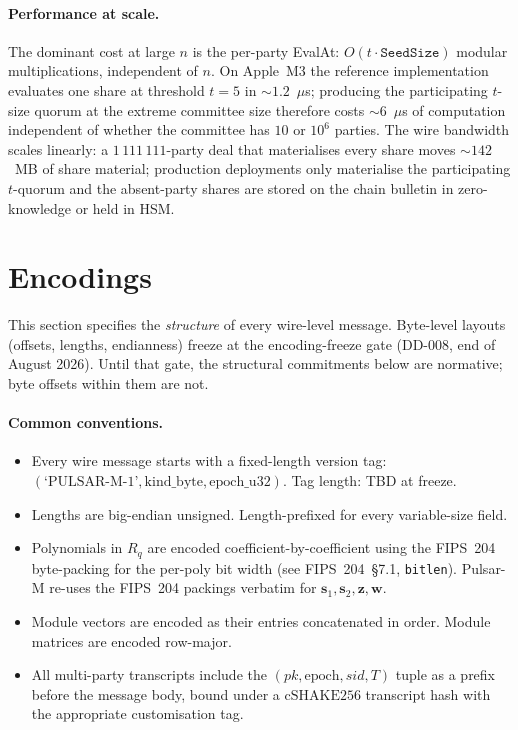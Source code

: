 \documentclass[11pt,a4paper]{article}
\theoremstyle{definition}
\theoremstyle{remark}
\newcommand{\Rq}{R_q}
\newcommand{\cSHAKE}{\mathrm{cSHAKE256}}
\begin{document}
\paragraph{Performance at scale.}
The dominant cost at large $n$ is the per-party EvalAt: $O(t \cdot
\mathtt{SeedSize})$ modular multiplications, independent of $n$. On
Apple~M3 the reference implementation evaluates one share at
threshold $t = 5$ in $\sim 1.2$~$\mu$s; producing the participating
$t$-size quorum at the extreme committee size therefore costs $\sim
6$~$\mu$s of computation independent of whether the committee has
$10$ or $10^6$ parties. The wire bandwidth scales linearly: a
$1\,111\,111$-party deal that materialises every share moves
$\sim 142$~MB of share material; production deployments only
materialise the participating $t$-quorum and the absent-party
shares are stored on the chain bulletin in zero-knowledge or
held in HSM.

\section{Encodings}
\label{sec:encodings}

This section specifies the \emph{structure} of every wire-level
message. Byte-level layouts (offsets, lengths, endianness) freeze at
the encoding-freeze gate (DD-008, end of August 2026). Until that
gate, the structural commitments below are normative; byte offsets
within them are not.

\paragraph{Common conventions.}
\begin{itemize}[leftmargin=*, itemsep=0pt]
\item Every wire message starts with a fixed-length version tag:
$(\text{`PULSAR-M-1'}, \text{kind\_byte}, \text{epoch\_u32})$.
Tag length: TBD at freeze.
\item Lengths are big-endian unsigned. Length-prefixed for every
variable-size field.
\item Polynomials in $\Rq$ are encoded coefficient-by-coefficient
using the FIPS~204 byte-packing for the per-poly bit width (see
FIPS~204~\S7.1, \texttt{bitlen}). Pulsar-M re-uses the FIPS~204
packings verbatim for $\mathbf{s}_1, \mathbf{s}_2, \mathbf{z}, \mathbf{w}$.
\item Module vectors are encoded as their entries concatenated in
order. Module matrices are encoded row-major.
\item All multi-party transcripts include the
$(\mathit{pk}, \text{epoch}, \mathit{sid}, T)$ tuple as a
prefix before the message body, bound under a $\cSHAKE$ transcript
hash with the appropriate customisation tag.
\end{itemize}
\end{document}
